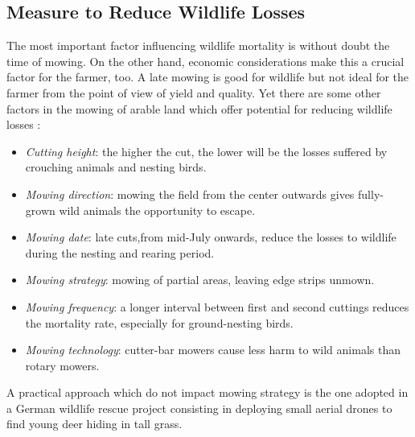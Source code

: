 \subsection{Measure to Reduce Wildlife Losses} %
\label{sub:measure_to_reduce_wildlife_losses}
 The most important factor influencing wildlife mortality is without doubt the time of mowing. On the other hand, economic considerations make this a crucial factor for the farmer, too. A late mowing is good for wildlife but not ideal for the farmer from the point of view of yield and quality. Yet there are some other factors in the mowing of arable land which offer potential for reducing wildlife losses \cite{MowlingMortality}:
\begin{itemize}
	\item \textit{Cutting height}: the higher the cut, the lower will be the losses suffered by crouching animals and nesting birds.
	\item \textit{Mowing direction}: mowing the field from the center outwards gives fully-grown wild animals the opportunity to escape.
	\item \textit{Mowing date}: late cuts,from mid-July onwards, reduce the losses to wildlife during the nesting and rearing period.
	\item \textit{Mowing strategy}: mowing of partial areas, leaving edge strips unmown.
	\item \textit{Mowing frequency}: a longer interval between first and second cuttings reduces the mortality rate, especially for ground-nesting birds.
	\item \textit{Mowing technology}: cutter-bar mowers cause less harm to wild animals than rotary mowers.
\end{itemize}
A practical approach which do not impact mowing strategy is the one adopted in a German wildlife rescue project consisting in deploying small aerial drones to find young deer hiding in tall grass.

